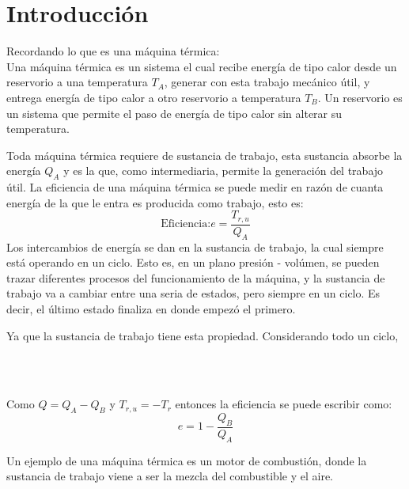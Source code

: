 \section{Introducción}

Recordando lo que es una máquina térmica:\\
Una máquina térmica es un sistema el cual recibe energía de tipo
calor desde un reservorio a una temperatura $T_A$, generar con esta
trabajo mecánico útil, y entrega energía de tipo calor a otro reservorio
a temperatura $T_B$. Un reservorio es un sistema que permite el paso de
energía de tipo calor sin alterar su temperatura.

\begin{center}
\end{center}

Toda máquina térmica requiere de sustancia de trabajo, esta sustancia absorbe la energía
$Q_A$ y es la que, como intermediaria, permite la generación del trabajo útil. La
eficiencia de una máquina térmica se puede medir en razón de cuanta energía de la que le
entra es producida como trabajo, esto es:
\[\text{Eficiencia:} e = \frac{T_{r,u}}{Q_A}\]
Los intercambios de energía se dan en la sustancia de trabajo, la cual siempre está operando
en un ciclo. Esto es, en un plano presión - volúmen, se pueden trazar diferentes procesos
del funcionamiento de la máquina, y la sustancia de trabajo va a cambiar entre una seria de
estados, pero siempre en un ciclo. Es decir, el último estado finaliza en donde empezó el primero.

Ya que la sustancia de trabajo tiene esta propiedad. Considerando todo un ciclo,

\begin{longderivation}
    \\
  \\
\end{longderivation}

Como $Q = Q_A - Q_B$ y $T_{r,u} = -T_r$ entonces la eficiencia se puede escribir
como:
\[e = 1 - \frac{Q_B}{Q_A}\]

Un ejemplo de una máquina térmica es un motor de combustión, donde la sustancia de trabajo
viene a ser la mezcla del combustible y el aire.